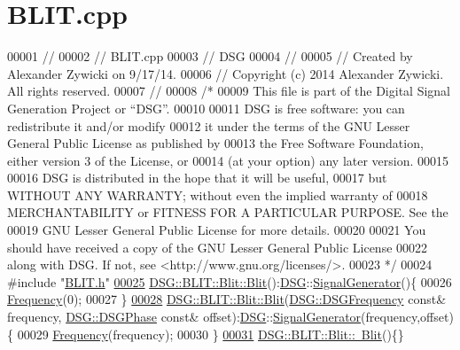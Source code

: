\hypertarget{_b_l_i_t_8cpp_source}{\section{B\+L\+I\+T.\+cpp}
\label{_b_l_i_t_8cpp_source}
}

\begin{DoxyCode}
00001 \textcolor{comment}{//}
00002 \textcolor{comment}{//  BLIT.cpp}
00003 \textcolor{comment}{//  DSG}
00004 \textcolor{comment}{//}
00005 \textcolor{comment}{//  Created by Alexander Zywicki on 9/17/14.}
00006 \textcolor{comment}{//  Copyright (c) 2014 Alexander Zywicki. All rights reserved.}
00007 \textcolor{comment}{//}
00008 \textcolor{comment}{/*}
00009 \textcolor{comment}{ This file is part of the Digital Signal Generation Project or “DSG”.}
00010 \textcolor{comment}{}
00011 \textcolor{comment}{ DSG is free software: you can redistribute it and/or modify}
00012 \textcolor{comment}{ it under the terms of the GNU Lesser General Public License as published by}
00013 \textcolor{comment}{ the Free Software Foundation, either version 3 of the License, or}
00014 \textcolor{comment}{ (at your option) any later version.}
00015 \textcolor{comment}{}
00016 \textcolor{comment}{ DSG is distributed in the hope that it will be useful,}
00017 \textcolor{comment}{ but WITHOUT ANY WARRANTY; without even the implied warranty of}
00018 \textcolor{comment}{ MERCHANTABILITY or FITNESS FOR A PARTICULAR PURPOSE.  See the}
00019 \textcolor{comment}{ GNU Lesser General Public License for more details.}
00020 \textcolor{comment}{}
00021 \textcolor{comment}{ You should have received a copy of the GNU Lesser General Public License}
00022 \textcolor{comment}{ along with DSG.  If not, see <http://www.gnu.org/licenses/>.}
00023 \textcolor{comment}{ */}
00024 \textcolor{preprocessor}{#include "\hyperlink{_b_l_i_t_8h}{BLIT.h}"}
\hypertarget{_b_l_i_t_8cpp_source_l00025}{}\hyperlink{class_d_s_g_1_1_b_l_i_t_1_1_blit_a1d9bed6285a8b3c0e073f3e3662716af}{00025} \hyperlink{class_d_s_g_1_1_b_l_i_t_1_1_blit_a1d9bed6285a8b3c0e073f3e3662716af}{DSG::BLIT::Blit::Blit}():\hyperlink{namespace_d_s_g}{DSG}::\hyperlink{class_d_s_g_1_1_signal_generator}{SignalGenerator}()\{
00026     \hyperlink{class_d_s_g_1_1_phasor_a6bdec1d2722e2fa5c7173ac5f7adf682}{Frequency}(0);
00027 \}
\hypertarget{_b_l_i_t_8cpp_source_l00028}{}\hyperlink{class_d_s_g_1_1_b_l_i_t_1_1_blit_a8ab0fb1b908d641527bb86a81d1722ba}{00028} \hyperlink{class_d_s_g_1_1_b_l_i_t_1_1_blit_a1d9bed6285a8b3c0e073f3e3662716af}{DSG::BLIT::Blit::Blit}(\hyperlink{namespace_d_s_g_a4315a061386fa1014fda09b15d3a6973}{DSG::DSGFrequency} \textcolor{keyword}{const}& frequency,
      \hyperlink{namespace_d_s_g_a44431ce1eb0a7300efdd207bc879e52c}{DSG::DSGPhase} \textcolor{keyword}{const}& offset):\hyperlink{namespace_d_s_g}{DSG}::\hyperlink{class_d_s_g_1_1_signal_generator}{SignalGenerator}(frequency,offset)\{
00029     \hyperlink{class_d_s_g_1_1_phasor_a6bdec1d2722e2fa5c7173ac5f7adf682}{Frequency}(frequency);
00030 \}
\hypertarget{_b_l_i_t_8cpp_source_l00031}{}\hyperlink{class_d_s_g_1_1_b_l_i_t_1_1_blit_a92da2e1763735b3e17f7b9a24377f988}{00031} \hyperlink{class_d_s_g_1_1_b_l_i_t_1_1_blit_a92da2e1763735b3e17f7b9a24377f988}{DSG::BLIT::Blit::~Blit}()\{\}
\end{DoxyCode}
